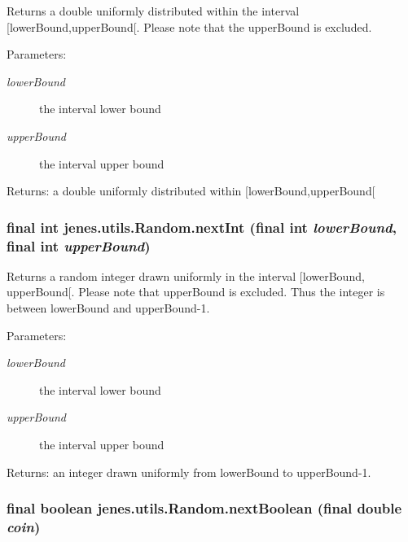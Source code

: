 Returns a double uniformly distributed within the interval \mbox{[}lowerBound,upperBound\mbox{[}. Please note that the upperBound is excluded. 

\begin{Desc}
\item[Parameters:]
\begin{description}
\item[{\em lowerBound}]the interval lower bound \item[{\em upperBound}]the interval upper bound \end{description}
\end{Desc}
\begin{Desc}
\item[Returns:]a double uniformly distributed within \mbox{[}lowerBound,upperBound\mbox{[} \end{Desc}
\hypertarget{classjenes_1_1utils_1_1_random_b066d2d2f6d32c89598c552a9dadedc0}{
\subsubsection[nextInt]{\setlength{\rightskip}{0pt plus 5cm}final int jenes.utils.Random.nextInt (final int {\em lowerBound}, \/  final int {\em upperBound})}}
\label{classjenes_1_1utils_1_1_random_b066d2d2f6d32c89598c552a9dadedc0}


Returns a random integer drawn uniformly in the interval \mbox{[}lowerBound, upperBound\mbox{[}. Please note that upperBound is excluded. Thus the integer is between lowerBound and upperBound-1. 

\begin{Desc}
\item[Parameters:]
\begin{description}
\item[{\em lowerBound}]the interval lower bound \item[{\em upperBound}]the interval upper bound \end{description}
\end{Desc}
\begin{Desc}
\item[Returns:]an integer drawn uniformly from lowerBound to upperBound-1. \end{Desc}
\hypertarget{classjenes_1_1utils_1_1_random_16e9050a46f8218ec8e0f73c6456a5db}{
\subsubsection[nextBoolean]{\setlength{\rightskip}{0pt plus 5cm}final boolean jenes.utils.Random.nextBoolean (final double {\em coin})}}
\label{classjenes_1_1utils_1_1_random_16e9050a46f8218ec8e0f73c6456a5db}



